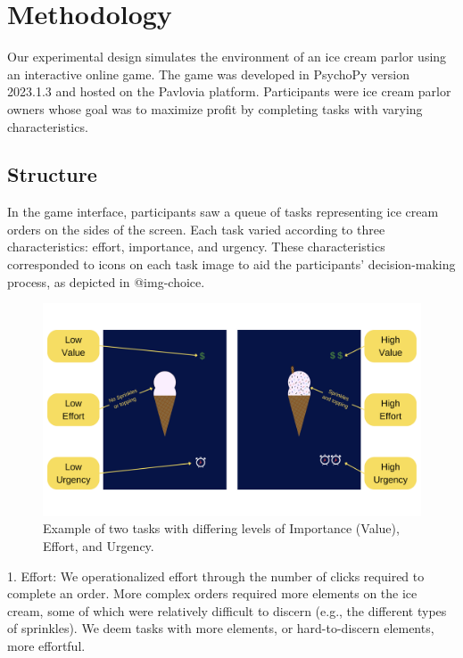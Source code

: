 \documentclass[
]{report}
\begin{document}
\hypertarget{methodology}{%
\section{Methodology}\label{methodology}}

Our experimental design simulates the environment of an ice cream parlor
using an interactive online game. The game was developed in PsychoPy
version 2023.1.3 and hosted on the Pavlovia platform. Participants were
ice cream parlor owners whose goal was to maximize profit by completing
tasks with varying characteristics.

\hypertarget{structure}{%
\subsection{Structure}\label{structure}}

In the game interface, participants saw a queue of tasks representing
ice cream orders on the sides of the screen. Each task varied according
to three characteristics: effort, importance, and urgency. These
characteristics corresponded to icons on each task image to aid the
participants' decision-making process, as depicted in @img-choice.

\begin{figure}

{\centering \includegraphics{images/tasks_example.png}

}

\caption{Example of two tasks with differing levels of Importance
(Value), Effort, and Urgency.}

\end{figure}

1. Effort: We operationalized effort through the number of clicks
required to complete an order. More complex orders required more
elements on the ice cream, some of which were relatively difficult to
discern (e.g., the different types of sprinkles). We deem tasks with
more elements, or hard-to-discern elements, more effortful.
\end{document}
